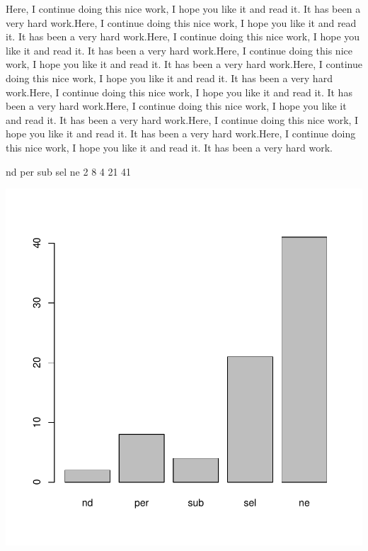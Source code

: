 \documentclass[11pt]{article}
\begin{document}
Here, I continue doing this nice work, I hope you like it and read it. It has been a very hard work.Here, I continue doing this nice work, I hope you like it and read it. It has been a very hard work.Here, I continue doing this nice work, I hope you like it and read it. It has been a very hard work.Here, I continue doing this nice work, I hope you like it and read it. It has been a very hard work.Here, I continue doing this nice work, I hope you like it and read it. It has been a very hard work.Here, I continue doing this nice work, I hope you like it and read it. It has been a very hard work.Here, I continue doing this nice work, I hope you like it and read it. It has been a very hard work.Here, I continue doing this nice work, I hope you like it and read it. It has been a very hard work.Here, I continue doing this nice work, I hope you like it and read it. It has been a very hard work.


\begin{Schunk}
\begin{Soutput}
 nd per sub sel  ne 
  2   8   4  21  41 
\end{Soutput}
\end{Schunk}

\includegraphics{PaperInR_3-cat_barplot}
\end{document}
